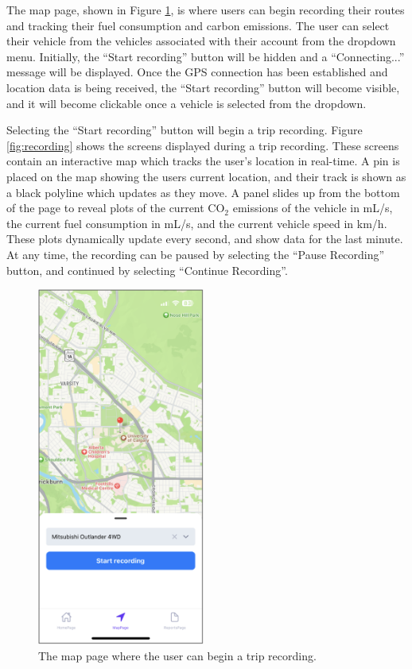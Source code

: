 \documentclass[11pt, oneside]{article}
\begin{document}
The map page, shown in Figure \ref*{fig:mappage}, is where users can begin recording their routes and tracking their fuel consumption and carbon emissions.  The user can select their vehicle from the vehicles associated with their account from the dropdown menu.  Initially, the ``Start recording'' button will be hidden and a ``Connecting...'' message will be displayed.  Once the GPS connection has been established and location data is being received, the ``Start recording'' button will become visible, and it will become clickable once a vehicle is selected from the dropdown.

Selecting the ``Start recording'' button will begin a trip recording.  Figure \ref*{fig:recording} shows the screens displayed during a trip recording.  These screens contain an interactive map which tracks the user's location in real-time.  A pin is placed on the map showing the users current location, and their track is shown as a black polyline which updates as they move.  A panel slides up from the bottom of the page to reveal plots of the current CO$_2$ emissions of the vehicle in mL/s, the current fuel consumption in mL/s, and the current vehicle speed in km/h.  These plots dynamically update every second, and show data for the last minute.  At any time, the recording can be paused by selecting the ``Pause Recording'' button, and continued by selecting ``Continue Recording''.  
\begin{figure}[!t]
\centerline{\includegraphics[width=5.5cm]{img/mapinit.png}}
\caption{\label{fig:mappage} The map page where the user can begin a trip recording.}
\end{figure}
\end{document}
